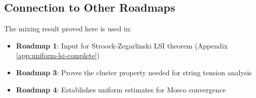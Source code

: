 \subsection{Connection to Other Roadmaps}

\begin{remark}
The mixing result proved here is used in:
\begin{itemize}
\item \textbf{Roadmap 1}: Input for Stroock-Zegarlinski LSI theorem (Appendix \ref{app:uniform-lsi-complete})
\item \textbf{Roadmap 3}: Proves the cluster property needed for string tension analysis
\item \textbf{Roadmap 4}: Establishes uniform estimates for Mosco convergence
\end{itemize}
\end{remark}
